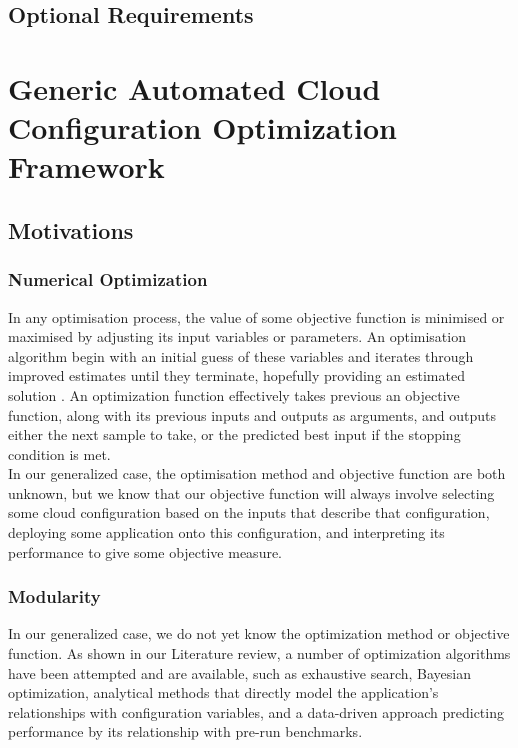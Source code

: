 \documentclass{report}
\begin{document}
\section{Optional Requirements}
\chapter{Generic Automated Cloud Configuration Optimization Framework}
\section{Motivations}
\subsection{Numerical Optimization}
In any optimisation process, the value of some objective function is minimised or maximised by adjusting its input variables or parameters. An optimisation algorithm begin with an initial guess of these variables and iterates through improved estimates until they terminate, hopefully providing an estimated solution \cite{Nocedal2006}. An optimization function effectively takes previous an objective function, along with its previous inputs and outputs as arguments, and outputs either the next sample to take, or the predicted best input if the stopping condition is met. \\
In our generalized case, the optimisation method and objective function are both unknown, but we know that our objective function will always involve selecting some cloud configuration based on the inputs that describe that configuration, deploying some application onto this configuration, and interpreting its performance to give some objective measure.
\subsection{Modularity}
In our generalized case, we do not yet know the optimization method or objective function. As shown in our Literature review, a number of optimization algorithms have been attempted and are available, such as exhaustive search, Bayesian optimization\cite{Alipourfard2017}, analytical methods that directly model the application's relationships with configuration variables\cite{Venkataraman2016}, and a data-driven approach predicting performance by its relationship with pre-run benchmarks\cite{Yadwadkar2017}.
\end{document}
